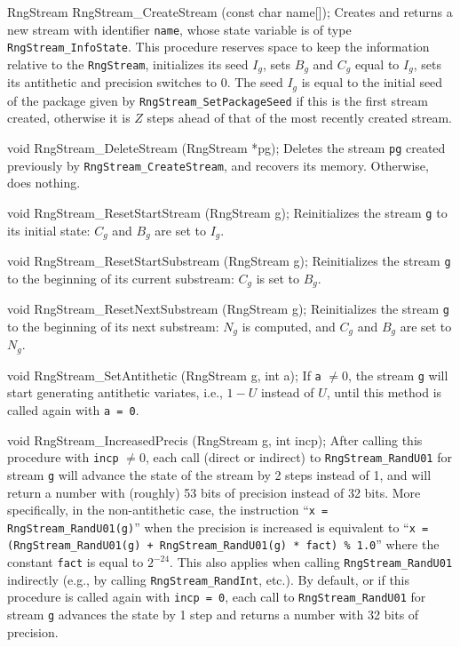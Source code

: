 \documentclass[12pt]{article}
\begin{document}
RngStream RngStream_CreateStream (const char name[]);
\endcode
 \tab Creates and returns a new stream with identifier {\tt name},
   whose state variable is of type {\tt RngStream\_InfoState}.
   This procedure reserves space to keep the information relative to
   the {\tt RngStream}, initializes its seed $I_g$,
   sets $B_g$ and $C_g$ equal to $I_g$, sets its antithetic and precision
   switches to 0.
   The seed $I_g$ is equal to the initial seed of the package given by 
   {\tt RngStream\_SetPackageSeed} if this is the first stream created,
   otherwise it is $Z$ steps ahead of that of the most recently
   created stream.
 \endtab
\code

void RngStream_DeleteStream (RngStream *pg);
\endcode
 \tab Deletes the stream {\tt *pg} created previously 
  by {\tt RngStream\_CreateStream}, and recovers its memory.
  Otherwise, does nothing. 
 \endtab
\code

void RngStream_ResetStartStream (RngStream g);
\endcode
 \tab Reinitializes the stream {\tt g} to its initial state:
   $C_g$ and $B_g$ are set to $I_g$.
 \endtab
\code

void RngStream_ResetStartSubstream (RngStream g);
\endcode
 \tab Reinitializes the stream {\tt g} to the beginning of its current
   substream: $C_g$ is set to $B_g$.
 \endtab
\code

void RngStream_ResetNextSubstream (RngStream g);
\endcode
 \tab Reinitializes the stream {\tt g} to the beginning of its next
   substream: $N_g$ is computed, and
   $C_g$ and $B_g$ are set to $N_g$.
 \endtab
\code

void RngStream_SetAntithetic (RngStream g, int a);
\endcode
 \tab  If {\tt a} $\neq 0$, the stream {\tt g} will start generating 
 antithetic variates, i.e., $1-U$ instead of $U$, until this method is
 called again with {\tt a = 0}.
 \endtab
\code

void RngStream_IncreasedPrecis (RngStream g, int incp);
\endcode
 \tab After calling this procedure with {\tt incp} $\neq 0$, each call
  (direct or indirect) to {\tt RngStream\_RandU01} for stream {\tt g}
  will advance the state of the stream by 2 steps instead of 1, and will 
  return a number with (roughly) 53 bits of precision instead of 32 bits.
  More specifically, in the non-antithetic case, the instruction
  ``{\tt x = RngStream\_RandU01(g)}'' when the precision is increased 
  is equivalent to
  ``{\tt x = (RngStream\_RandU01(g) + RngStream\_RandU01(g) * fact) \%\ 1.0}'' 
  where the constant {\tt fact} is equal to $2^{-24}$.
  This also applies when calling {\tt RngStream\_RandU01} indirectly
  (e.g., by calling {\tt RngStream\_RandInt}, etc.).
  By default, or if this procedure is called again with {\tt incp = 0}, 
  each call to {\tt RngStream\_RandU01} for stream {\tt g} 
   advances the state by 1 step and returns a 
  number with 32 bits of precision.
 \endtab
\code
\end{document}
